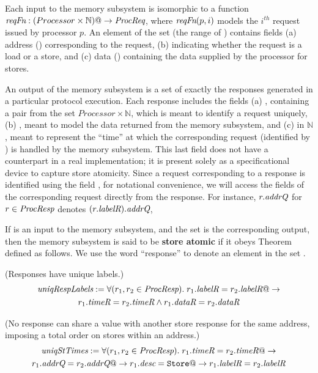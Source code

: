 Each input to the memory subsystem is isomorphic to a function
$\textit{reqFn} : (Processor \times \mathbb{N}) @-> \textit{ProcReq}$, where $\textit{reqFn}(p, i)$ models the
$i^{th}$ request issued by processor $p$. An element of the set \Request{} (the
range of \reqFn{}) contains fields (a) address (\addrQ) corresponding to
the request, (b) \desc{} indicating whether the request is a load or a store,
and (c) data (\dataQ) containing the data supplied by the processor for stores.

An output of the memory subsystem is a set \Response{} of exactly the responses generated
in a particular protocol execution.  Each response includes the fields
(a) , containing a pair from the set
$Processor \times \mathbb{N}$, which is meant to identify a request uniquely, (b)
\dataR, meant to model the data returned from the memory subsystem, and (c)
\timeR{} in $\mathbb{N}$, meant to represent the ``time'' at which
the corresponding request (identified by ) is handled by the memory
subsystem. This last field does not have a counterpart in a real implementation; it is
present solely as a specificational device to capture store atomicity. Since a
request corresponding to a response is identified using the field , for
notational convenience, we will access the fields of the corresponding request
directly from the response. For instance, $r.\textit{addrQ}$ for $r \in \textit{ProcResp}$
denotes $(r.\textit{labelR}).\textit{addrQ}$, \etc

If \reqFn{} is an input to the memory subsystem, and the set \Response{} is the
corresponding output, then the memory subsystem is said to be \textbf{store atomic} if it
obeys Theorem~ defined as follows. We use the word
``response'' to denote an element in the set \Response{}.
%
\begin{defn} (Responses have unique labels.)
\small
\begin{multline*}
\textit{uniqRespLabels} := \forall (r_1, r_2 \in \textit{ProcResp}). \;
r_1.\textit{labelR} = r_2.\textit{labelR} @-> \\ r_1.\textit{timeR} = r_2.\textit{timeR} \wedge
r_1.\textit{dataR} = r_2.\textit{dataR}
\end{multline*}
\label{uniqRespLabels}
\end{defn}

\vspace{-.3in}

\begin{defn} (No response can share a \timeR{} value with another store
response for the same address, imposing a total order on stores within an address.)
\small
\begin{multline*}
\textit{uniqStTimes} := 
\forall (r_1, r_2 \in \textit{ProcResp}). \;
r_1.\textit{timeR} = r_2.\textit{timeR} @-> \\
r_1.\textit{addrQ} = r_2.\textit{addrQ} @->
r_1.\textit{desc} = \texttt{Store} @->
r_1.\textit{labelR} = r_2.\textit{labelR}
\end{multline*}
\label{uniqStTimes}
\end{defn}

